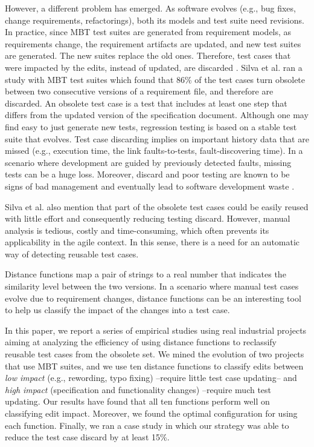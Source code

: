 However, a different problem has emerged. As software evolves (e.g., bug fixes, change requirements, refactorings), both its models and test suite need revisions. In practice, since MBT test suites are generated from requirement models, as requirements change, the requirement artifacts are updated, and new test suites are generated. The new suites replace the old ones. Therefore, test cases that were impacted by the edits, instead of updated, are discarded \cite{de2016full}. 
Silva et al. \cite{Silva:2018:SIM:3266003.3266009} ran a study with MBT test suites which found that 86\% of the test cases turn obsolete between two consecutive versions of a requirement file, and therefore are discarded. An obsolete test case is a test that includes at least one step that differs from the updated version of the specification document. Although one may find easy to just generate new tests, regression testing is based on a stable test suite that evolves. Test case discarding implies on important history data that are missed (e.g., execution time, the link faults-to-tests, fault-discovering time). In a scenario where development are guided by previously detected faults, missing tests can be a huge loss. Moreover, discard and poor testing are known to be signs of bad management and eventually lead to software development waste \cite{sedano2017waste}.


Silva et al. \cite{Silva:2018:SIM:3266003.3266009} also mention 
that part of the obsolete test cases could be easily reused with little effort and consequently reducing testing discard. However, manual analysis is tedious, costly and time-consuming, which often prevents its applicability in the agile context.  In this sense, there is a need for an automatic way of detecting reusable test cases. 

Distance functions \cite{cohen2003distance} map a pair of strings to a real number that indicates the similarity level between the two versions. In a scenario where manual test cases evolve due to requirement changes, distance functions can be an interesting tool to help us classify the impact of the changes into a test case.  

In this paper, we report a series of empirical studies using real industrial projects aiming at analyzing the efficiency of using distance functions to reclassify reusable test cases from the obsolete set. 
We mined the evolution of two projects that use MBT suites, and we use ten distance functions to classify edits between \textit{low impact} (e.g., rewording, typo fixing) --require little test case updating-- and \textit{high impact} (specification and functionality changes) --require much test updating. Our results have found that all ten functions perform well on classifying edit impact. Moreover, we found the optimal configuration for using each function. Finally, we ran a case study in which our strategy was able to reduce the test case discard by at least 15\%.


